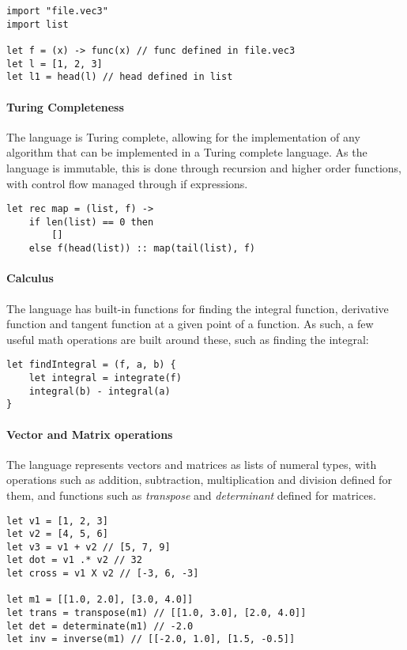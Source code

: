 \begin{verbatim}
import "file.vec3"
import list

let f = (x) -> func(x) // func defined in file.vec3
let l = [1, 2, 3]
let l1 = head(l) // head defined in list
\end{verbatim}

\paragraph{Turing Completeness} The language is Turing complete, allowing for the implementation of any
algorithm that can be implemented in a Turing complete language.
As the language is immutable, this is done through recursion and higher order functions, with control flow
managed through if expressions.

\begin{verbatim}
let rec map = (list, f) -> 
    if len(list) == 0 then 
        [] 
    else f(head(list)) :: map(tail(list), f)
\end{verbatim}

\paragraph{Calculus} The language has built-in functions for finding the integral function, derivative function
and tangent function at a given point of a function.
As such, a few useful math operations are built around these, such as finding the integral:

\begin{verbatim}
let findIntegral = (f, a, b) {
    let integral = integrate(f)
    integral(b) - integral(a)
}
\end{verbatim}

\paragraph{Vector and Matrix operations} The language represents vectors and matrices as lists of numeral types, with
operations such as addition, subtraction, multiplication and division defined for them, and functions such as \textit{transpose} and \textit{determinant} defined for matrices.

\begin{verbatim}
let v1 = [1, 2, 3]
let v2 = [4, 5, 6]
let v3 = v1 + v2 // [5, 7, 9]
let dot = v1 .* v2 // 32
let cross = v1 X v2 // [-3, 6, -3]

let m1 = [[1.0, 2.0], [3.0, 4.0]]
let trans = transpose(m1) // [[1.0, 3.0], [2.0, 4.0]]
let det = determinate(m1) // -2.0
let inv = inverse(m1) // [[-2.0, 1.0], [1.5, -0.5]]
\end{verbatim}

